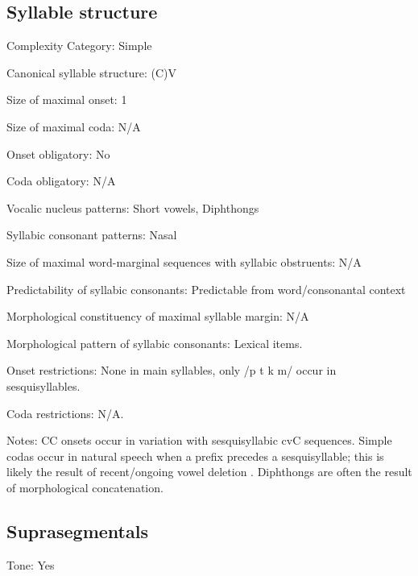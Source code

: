 {\subsection*{Syllable structure}
\begin{appendixdesc}

\item[Complexity Category:] Simple

\item[Canonical syllable structure:] (C)V \citep[57--64]{Teo2009}

\item[Size of maximal onset:] 1

\item[Size of maximal coda:] N/A

\item[Onset obligatory:] No

\item[Coda obligatory:] N/A

\item[Vocalic nucleus patterns:] Short vowels, Diphthongs

\item[Syllabic consonant patterns:] Nasal

\item[Size of maximal word-marginal sequences with syllabic obstruents:] N/A

\item[Predictability of syllabic consonants:] Predictable from word/consonantal context

\item[Morphological constituency of maximal syllable margin:] N/A

\item[Morphological pattern of syllabic consonants:] Lexical items.

\item[Onset restrictions:] None in main syllables, only /p t k m/ occur in sesquisyllables.

\item[Coda restrictions:] N/A.

\item[Notes:] CC onsets occur in variation with sesquisyllabic cvC sequences. Simple codas occur in natural speech when a prefix precedes a sesquisyllable; this is likely the result of recent/ongoing vowel deletion \citep[62--64]{Teo2009}. Diphthongs are often the result of morphological concatenation.
\end{appendixdesc}
\subsection*{Suprasegmentals}
\begin{appendixdesc}
\item[Tone:] Yes


\end{appendixdesc}}
